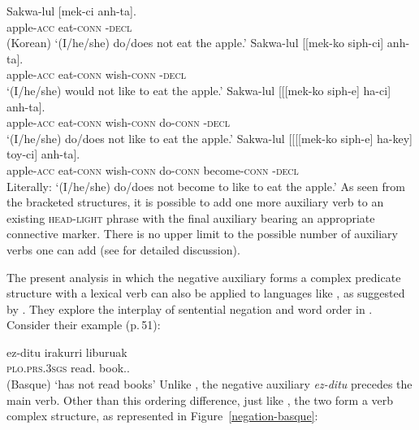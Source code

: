 \documentclass[output=paper
 	        ,biblatex
                ,babelshorthands
                ,newtxmath
                ,draftmode
                ,colorlinks, citecolor=brown
]{langscibook}
\begin{document}
\begin{exe}
\begin{xlist}
\begin{exe}
\begin{xlist}
\eal
\ex
\gll Sakwa-lul          [mek-ci anh-ta]. \\
     apple-\textsc{acc} \spacebr{}eat-\textsc{conn} \NEG-\textsc{decl} \\\hfill(Korean)
\glt `(I/he/she) do/does not eat the apple.'
\ex
\gll Sakwa-lul          [[mek-ko siph-ci] anh-ta]. \\
     apple-\textsc{acc} \hphantom{[[}eat-\textsc{conn} wish-\textsc{conn} \NEG-\textsc{decl} \\
\glt `(I/he/she) would not like to eat the apple.'
%
\ex \label{negation-20c}
\gll Sakwa-lul          [[[mek-ko siph-e] ha-ci] anh-ta]. \\
     apple-\textsc{acc} \hphantom{[[[}eat-\textsc{conn} wish-\textsc{conn} do-\textsc{conn} \NEG-\textsc{decl} \\
\glt `(I/he/she) do/does not like to eat the apple.'
%
\ex
\gll Sakwa-lul          [[[[mek-ko siph-e] ha-key] toy-ci] anh-ta]. \\
     apple-\textsc{acc} \hphantom{[[[[}eat-\textsc{conn} wish-\textsc{conn} do-\textsc{conn} become-\textsc{conn} \NEG-\textsc{decl} \\
\glt Literally: `(I/he/she) do/does not become to like to eat the apple.'
\zl
%
As seen from the bracketed structures, it is possible to add one more auxiliary verb to
an existing \textsc{head-light} phrase with the final auxiliary bearing an appropriate
  connective marker. There is no upper limit to the possible number  of auxiliary
  verbs one can add (see \citealt[]{Kim:16} for detailed discussion).

The present analysis in which the  negative auxiliary forms a complex
predicate structure with a lexical verb can also be applied to languages
like , as suggested by \citet{CB:11}. They explore the interplay of sentential
negation and word order in . Consider their example (p.\,51):

\ea
\label{negation-basque-ex}
\gll ez-ditu irakurri liburuak \\
     \textsc{plo}.\textsc{prs}.\textsc{3sgs} read.\PRF{} book.\ABS.\pl\\\hfill(Basque)
\glt `has not read books'
\z
%
%
Unlike , the negative auxiliary \textit{ez-ditu} precedes
the main verb. Other than this ordering difference, just
like , the two form a verb complex structure, as represented in
Figure~\ref{negation-basque}:


\end{xlist}
\end{exe}
\end{xlist}
\end{exe}
\end{document}
